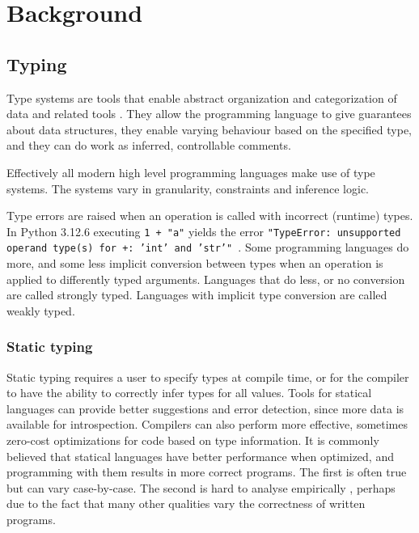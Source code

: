 \chapter{Background\label{background}}


\section{Typing}

Type systems are tools that enable abstract organization and categorization of data and related tools \cite{programming_langs}. They allow the programming language to give guarantees about data structures, they enable varying behaviour based on the specified type, and they can do work as inferred, controllable comments.

Effectively all modern high level programming languages make use of type systems. The systems vary in granularity, constraints and inference logic. 

Type errors are raised when an operation is called with incorrect (runtime) types. In Python 3.12.6 executing {\tt 1 + "a"} yields the error {\tt "TypeError: unsupported operand type(s) for +: 'int' and 'str'" }. Some programming languages do more, and some less implicit conversion between types when an operation is applied to differently typed arguments. Languages that do less, or no conversion are called strongly typed. Languages with implicit type conversion are called weakly typed. %


\subsection{Static typing}
Static typing requires a user to specify types at compile time, or for the compiler to have the ability to correctly infer types for all values. Tools for statical languages can provide better suggestions and error detection, since more data is available for introspection. Compilers can also perform more effective, sometimes zero-cost optimizations for code based on type information. It is commonly believed that statical languages have better performance when optimized, and programming with them results in more correct programs. The first is often true but can vary case-by-case.  The second is hard to analyse empirically \cite{codequality_reproudction_2019}, perhaps due to the fact that  many other qualities vary the correctness of written programs. 

